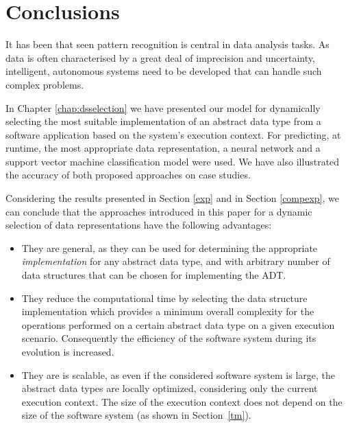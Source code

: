 
\chapter{Conclusions}
\label{chap:concth}

It has been that seen pattern recognition is central in data analysis tasks. As data is often characterised by a great deal of imprecision and uncertainty, intelligent, autonomous systems need to be developed that can handle such complex problems.

In Chapter \ref{chap:dsselection} we have presented our model for dynamically selecting the most suitable implementation of an abstract data type from a software application based on the system's execution context. For predicting, at runtime, the most appropriate data representation, a neural network and a support vector machine classification model were used. We have also illustrated the accuracy of both proposed approaches on case studies.

Considering the results presented in Section \ref{exp} and in Section \ref{compexp}, we can conclude that the approaches introduced in this paper for a dynamic selection of data representations have the following advantages:

\begin{itemize}

\item They are general, as they can be used for determining the appropriate \emph{implementation} for any abstract data type, and with arbitrary number of data structures that can be chosen for implementing the ADT.

\item They reduce the computational time by selecting the data structure implementation which provides a minimum overall complexity for the operations performed on a certain abstract data type on a given execution scenario. Consequently the efficiency of the software system during its evolution is increased.

\item They are is scalable, as even if the considered software system is large, the abstract data types are locally optimized, considering only the current execution context. The size of the execution context does not depend on the size of the software system (as shown in Section~\ref{tm}).

\end{itemize}

